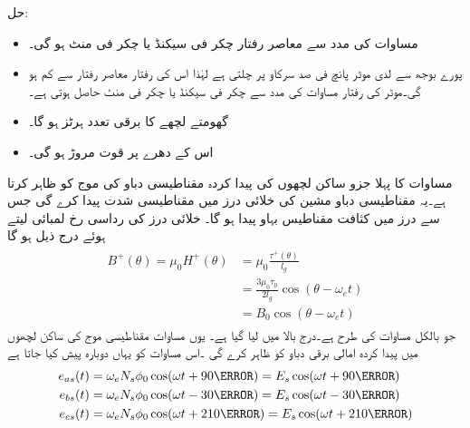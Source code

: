 حل:
\begin{itemize}
\item
مساوات   کی مدد سے معاصر رفتار  چکر فی سیکنڈ یا  چکر فی منٹ ہو گی۔
\item
پورے بوجھ سے لدی موٹر پانچ فی صد سرکاو پر چلتی ہے لہٰذا اس کی رفتار معاصر رفتار سے  کم ہو گی۔موٹر کی رفتار مساوات    کی مدد سے  چکر فی سیکنڈ یا  چکر فی منٹ حاصل ہوتی ہے۔
\item
گھومتے لچھے کا برقی تعدد   ہرٹز ہو گا۔
\item
اس کے دھرے پر قوت مروڑ  ہو گی۔
\end{itemize}
%
مساوات   کا پہلا جزو ساکن لچھوں کی پیدا کردہ مقناطیسی دباو کی موج  کو ظاہر کرتا ہے۔یہ مقناطیسی دباو مشین کی خلائی درز میں مقناطیسی شدت  پیدا کرے گی جس سے درز میں  کثافت مقناطیس بہاو  پیدا ہو گا۔ خلائی درز کی رداسی رخ  لمبائی  لیتے ہوئے درج ذیل ہو گا
\begin{gather}
\begin{aligned}\label{مساوات_امالی-سرک_تعلق_پ}
B^+(\theta)=\mu_0 H^+(\theta)&=\mu_0 \frac{\tau^+(\theta)}{l_g}\\
&=\frac{3 \mu_0 \tau_0}{2 l_g} \cos (\theta-\omega_e t)\\
&=B_0 \cos (\theta-\omega_e t)
\end{aligned}
\end{gather}
جو بالکل مساوات   کی طرح ہے۔درج بالا میں  لیا گیا ہے۔ یوں مساوات    مقناطیسی موج  کی ساکن لچھوں میں پیدا کردہ امالی برقی دباو کو ظاہر کرے گی ۔اس مساوات کو یہاں دوبارہ پیش کیا جاتا ہے
\begin{gather}
\begin{aligned}\label{مساوات_امالی_تین_دور_سائن_نما_برقی_دباو}
e_{as}(t)&=\omega_e N_s \phi_0 \cos (\omega t +90\degree)=E_s \cos (\omega t +90\degree)\\
e_{bs}(t)&=\omega_e N_s \phi_0 \cos (\omega t -30\degree)=E_s \cos (\omega t -30\degree)\\
e_{cs}(t)&=\omega_e N_s \phi_0 \cos (\omega t +210\degree)=E_s \cos (\omega t +210\degree)
\end{aligned}
\end{gather}
